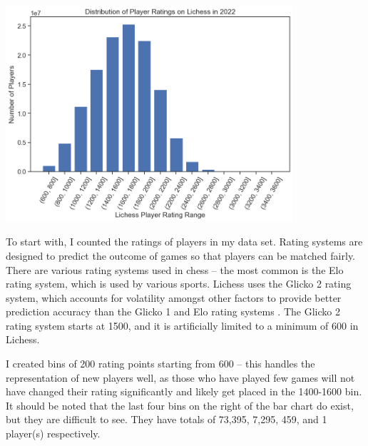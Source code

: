 \documentclass[a4paper, 11pt]{article}
\begin{document}
\begin{center}
    \includegraphics[width=0.8\textwidth]{Distribution of Player Ratings.png}
\end{center}

To start with, I counted the ratings of players in my data set. Rating systems are designed to predict the outcome of games so that players can be matched fairly. There are various rating systems used in chess -- the most common is the Elo rating system, which is used by various sports. Lichess uses the Glicko 2 rating system, which accounts for volatility amongst other factors to provide better prediction accuracy than the Glicko 1 and Elo rating systems \cite{chessRatingSystems, DeloitteFIDEChessRatingChallenge}. The Glicko 2 rating system starts at 1500, and it is artificially limited to a minimum of 600 in Lichess.

I created bins of 200 rating points starting from 600 -- this handles the representation of new players well, as those who have played few games will not have changed their rating significantly and likely get placed in the 1400-1600 bin. It should be noted that the last four bins on the right of the bar chart do exist, but they are difficult to see. They have totals of 73,395, 7,295, 459, and 1 player(s) respectively.
\end{document}

